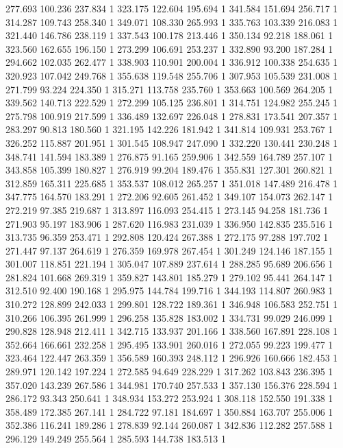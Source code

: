 	277.693	100.236	237.834	1
	323.175	122.604	195.694	1
	341.584	151.694	256.717	1
	314.287	109.743	258.340	1
	349.071	108.330	265.993	1
	335.763	103.339	216.083	1
	321.440	146.786	238.119	1
	337.543	100.178	213.446	1
	350.134	92.218	188.061	1
	323.560	162.655	196.150	1
	273.299	106.691	253.237	1
	332.890	93.200	187.284	1
	294.662	102.035	262.477	1
	338.903	110.901	200.004	1
	336.912	100.338	254.635	1
	320.923	107.042	249.768	1
	355.638	119.548	255.706	1
	307.953	105.539	231.008	1
	271.799	93.224	224.350	1
	315.271	113.758	235.760	1
	353.663	100.569	264.205	1
	339.562	140.713	222.529	1
	272.299	105.125	236.801	1
	314.751	124.982	255.245	1
	275.798	100.919	217.599	1
	336.489	132.697	226.048	1
	278.831	173.541	207.357	1
	283.297	90.813	180.560	1
	321.195	142.226	181.942	1
	341.814	109.931	253.767	1
	326.252	115.887	201.951	1
	301.545	108.947	247.090	1
	332.220	130.441	230.248	1
	348.741	141.594	183.389	1
	276.875	91.165	259.906	1
	342.559	164.789	257.107	1
	343.858	105.399	180.827	1
	276.919	99.204	189.476	1
	355.831	127.301	260.821	1
	312.859	165.311	225.685	1
	353.537	108.012	265.257	1
	351.018	147.489	216.478	1
	347.775	164.570	183.291	1
	272.206	92.605	261.452	1
	349.107	154.073	262.147	1
	272.219	97.385	219.687	1
	313.897	116.093	254.415	1
	273.145	94.258	181.736	1
	271.903	95.197	183.906	1
	287.620	116.983	231.039	1
	336.950	142.835	235.516	1
	313.735	96.359	253.471	1
	292.808	120.424	267.388	1
	272.175	97.288	197.702	1
	271.447	97.137	264.619	1
	276.359	169.978	267.454	1
	301.249	124.146	187.155	1
	301.007	118.851	221.194	1
	305.047	107.889	237.614	1
	288.285	95.689	206.656	1
	281.824	101.668	269.319	1
	359.827	143.801	185.279	1
	279.102	95.441	264.147	1
	312.510	92.400	190.168	1
	295.975	144.784	199.716	1
	344.193	114.807	260.983	1
	310.272	128.899	242.033	1
	299.801	128.722	189.361	1
	346.948	106.583	252.751	1
	310.266	106.395	261.999	1
	296.258	135.828	183.002	1
	334.731	99.029	246.099	1
	290.828	128.948	212.411	1
	342.715	133.937	201.166	1
	338.560	167.891	228.108	1
	352.664	166.661	232.258	1
	295.495	133.901	260.016	1
	272.055	99.223	199.477	1
	323.464	122.447	263.359	1
	356.589	160.393	248.112	1
	296.926	160.666	182.453	1
	289.971	120.142	197.224	1
	272.585	94.649	228.229	1
	317.262	103.843	236.395	1
	357.020	143.239	267.586	1
	344.981	170.740	257.533	1
	357.130	156.376	228.594	1
	286.172	93.343	250.641	1
	348.934	153.272	253.924	1
	308.118	152.550	191.338	1
	358.489	172.385	267.141	1
	284.722	97.181	184.697	1
	350.884	163.707	255.006	1
	352.386	116.241	189.286	1
	278.839	92.144	260.087	1
	342.836	112.282	257.588	1
	296.129	149.249	255.564	1
	285.593	144.738	183.513	1
